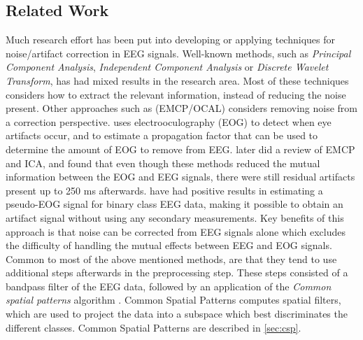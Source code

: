 \subsection{Related Work}
Much research effort has been put into developing or applying techniques for noise/artifact correction in EEG signals. Well-known methods, such as \textit{Principal Component Analysis}, \textit{Independent Component Analysis} or \textit{Discrete Wavelet Transform}, has had mixed results in the research area. Most of these techniques considers how to extract the relevant information, instead of reducing the noise present.
Other approaches such as (EMCP/OCAL) considers removing noise from a correction perspective. \cite{gratton1983new} uses electrooculography (EOG) to detect when eye artifacts occur, and to estimate a propagation factor that can be used to determine the amount of EOG to remove from EEG. \cite{hoffmann2008correction} later did a review of EMCP and ICA, and found that even though these methods reduced the mutual information between the EOG and EEG signals, there were still residual artifacts present up to 250 ms afterwards. \cite{li2015ocular} have had positive results in estimating a pseudo-EOG signal for binary class EEG data, making it possible to obtain an artifact signal without using any secondary measurements. Key benefits of this approach is that noise can be corrected from EEG signals alone which excludes the difficulty of handling the mutual effects between EEG and EOG signals. Common to most of the above mentioned methods, are that they tend to use additional steps afterwards in the preprocessing step. These steps consisted of a bandpass filter of the EEG data, followed by an application of the \emph{Common spatial patterns} algorithm \cite{ramoser2000optimal}. Common Spatial Patterns computes spatial filters, which are used to project the data into a subspace which best discriminates the different classes. Common Spatial Patterns are described in \cref{sec:csp}.

